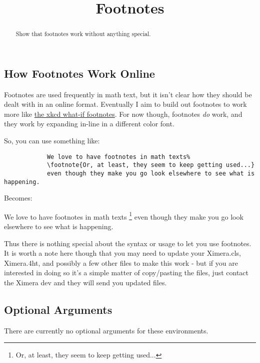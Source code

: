 \documentclass{ximera}
\title{Footnotes}
\begin{document}
\begin{abstract}
    Show that footnotes work without anything special.
\end{abstract}
\maketitle

    \subsection*{How Footnotes Work Online}
        Footnotes are used frequently in math text, but it isn't clear how they should be dealt with in an online format. Eventually I aim to build out footnotes to work more like \href{https://what-if.xkcd.com/}{the xkcd what-if footnotes}. For now though, footnotes \textit{do} work, and they work by expanding in-line in a different color font.
        
        So, you can use something like:
        
        \begin{verbatim}
            We love to have footnotes in math texts%
            \footnote{Or, at least, they seem to keep getting used...}
            even though they make you go look elsewhere to see what is happening.
        \end{verbatim}
        
        Becomes:
        
        We love to have footnotes in math texts%
        \footnote{Or, at least, they seem to keep getting used...}
        even though they make you go look elsewhere to see what is happening.
        
        Thus there is nothing special about the syntax or usage to let you use footnotes. It is worth a note here though that you may need to update your Ximera.cls, Ximera.4ht, and possibly a few other files to make this work - but if you are interested in doing so it's a simple matter of copy/pasting the files, just contact the Ximera dev and they will send you updated files.


        
    \subsection*{Optional Arguments}
        There are currently no optional arguments for these environments.
\end{document}
